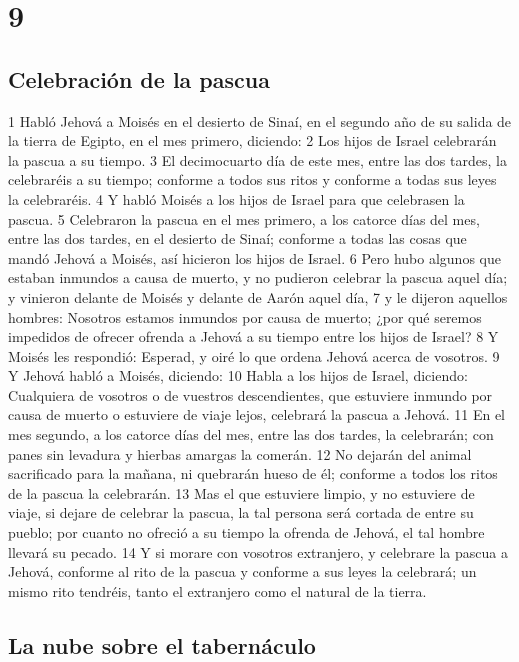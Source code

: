 \chapter{9}

\section*{Celebración de la pascua}

1 Habló Jehová a Moisés en el desierto de Sinaí, en el segundo año de su salida de la tierra de Egipto, en el mes primero, diciendo:
2 Los hijos de Israel celebrarán la pascua a su tiempo.
3 El decimocuarto día de este mes, entre las dos tardes, la celebraréis a su tiempo; conforme a todos sus ritos y conforme a todas sus leyes la celebraréis.
4 Y habló Moisés a los hijos de Israel para que celebrasen la pascua.
5 Celebraron la pascua en el mes primero, a los catorce días del mes, entre las dos tardes, en el desierto de Sinaí; conforme a todas las cosas que mandó Jehová a Moisés, así hicieron los hijos de Israel.
6 Pero hubo algunos que estaban inmundos a causa de muerto, y no pudieron celebrar la pascua aquel día; y vinieron delante de Moisés y delante de Aarón aquel día, 
7 y le dijeron aquellos hombres: Nosotros estamos inmundos por causa de muerto; ¿por qué seremos impedidos de ofrecer ofrenda a Jehová a su tiempo entre los hijos de Israel?
8 Y Moisés les respondió: Esperad, y oiré lo que ordena Jehová acerca de vosotros.
9 Y Jehová habló a Moisés, diciendo:
10 Habla a los hijos de Israel, diciendo: Cualquiera de vosotros o de vuestros descendientes, que estuviere inmundo por causa de muerto o estuviere de viaje lejos, celebrará la pascua a Jehová.
11 En el mes segundo, a los catorce días del mes, entre las dos tardes, la celebrarán; con panes sin levadura y hierbas amargas la comerán.
12 No dejarán del animal sacrificado para la mañana, ni quebrarán hueso de él; conforme a todos los ritos de la pascua la celebrarán.
13 Mas el que estuviere limpio, y no estuviere de viaje, si dejare de celebrar la pascua, la tal persona será cortada de entre su pueblo; por cuanto no ofreció a su tiempo la ofrenda de Jehová, el tal hombre llevará su pecado.
14 Y si morare con vosotros extranjero, y celebrare la pascua a Jehová, conforme al rito de la pascua y conforme a sus leyes la celebrará; un mismo rito tendréis, tanto el extranjero como el natural de la tierra.

\section*{La nube sobre el tabernáculo }

